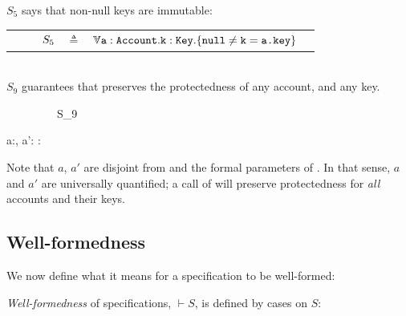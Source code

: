 {
 \begin{example}
 \label{example:twostate}
 \label{example:mprepostl}
 $S_5$  says %
  that   non-null keys are immutable:
 \\
 \begin{tabular}{lcll}
$\strut \ \ \ \ \ \ \ \ S_5$ & $\triangleq$   & ${\TwoStatesN {\prg{a}:\prg{Account}.\prg{k}:\prg{Key}}  {\prg{null}\neq \prg{k}=\prg{a.\password}}} $  \end{tabular}
\\
%
%
% 
$S_9$    guarantees that  preserves the protectedness of any account, and any key.  \\
   {\sprepost
		{\strut \ \ \ \ \ \ \ \ \ S_9} 
		{  a:, a':\wedge  {}\wedge  {} }
		{} {} {:}
		{   \wedge  {}  }
		{   \wedge  {} }
}

\noindent
Note that  $a$, $a'$ are disjoint from  and the formal parameters of . 
In that sense, $a$ and $a'$ are universally quantified; a call of  will preserve protectedness for \emph{ all} accounts and their keys. 

\end{example}

\subsection{\textbf{Well-formedness}} We now define what it means for a specification to be well-formed:

\begin{definition}%
 {\emph{Well-formedness}} of specifications,  $\vdash S$,  is   defined by cases on $S$:
\label{f:holistic-wff}


\end{definition}}
